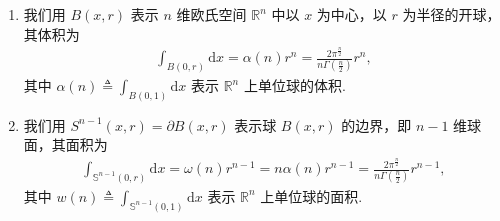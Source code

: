 \documentclass[../../main.tex]{subfiles}%
\begin{document}
\begin{theorem}\label{theorem:Rn中球体积和面积公式}
\begin{enumerate}[(1)]
\item 我们用 $B(x,r)$ 表示 $n$ 维欧氏空间 $\mathbb{R}^n$ 中以 $x$ 为中心，以 $r$ 为半径的开球，其体积为
\begin{align*}
\int_{B\left( 0,r \right)}{\mathrm{d}x}=\alpha(n)r^n = \frac{2\pi^{\frac{n}{2}}}{n\Gamma\left(\frac{n}{2}\right)}r^n,
\end{align*}
其中 $\alpha (n)\triangleq \int_{B(0,1)}{\mathrm{d}x}$ 表示 $\mathbb{R}^n$ 上单位球的体积.

\item 我们用 $S^{n-1}(x,r)=\partial B(x,r)$ 表示球 $B(x,r)$ 的边界，即 $n-1$ 维球面，其面积为
\begin{align*}
\int_{\mathbb{S}^{n-1}\left( 0,r \right)}{\mathrm{d}x}=\omega(n)r^{n-1} = n\alpha(n)r^{n-1}=\frac{2\pi^{\frac{n}{2}}}{n\Gamma\left(\frac{n}{2}\right)}r^{n-1},
\end{align*}
其中 $w\left( n \right) \triangleq \int_{\mathbb{S} ^{n-1}(0,1)}{\mathrm{d}x}$ 表示 $\mathbb{R}^n$ 上单位球的面积.
\end{enumerate}
\end{theorem}
\end{document}

